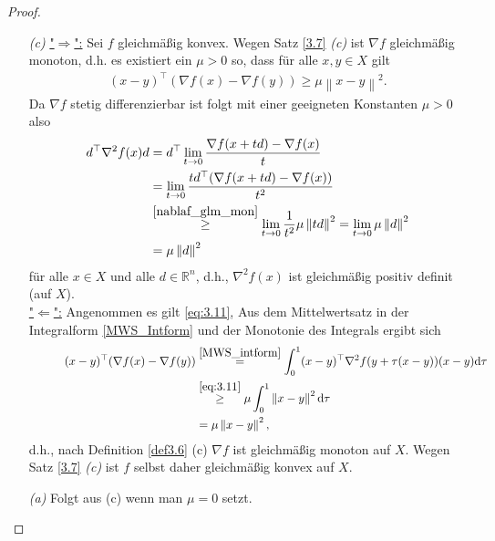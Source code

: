 \documentclass[a4paper,reqno]{amsart}
\theoremstyle{definition}
\theoremstyle{remark}
\newcommand\norm[1]{\left\lVert#1\right\rVert}
\newcommand{\dd}{\textnormal{d}}
\begin{document}
\begin{proof}$ $\newline
    \begin{itemize}%
\item[\emph{(c)}] \underline{"$\Rightarrow$\!":} Sei $f$ gleichmäßig konvex. Wegen
    Satz \ref{3.7} \emph{(c)} ist
    $\nabla f$ gleichmäßig monoton, d.h. es existiert ein $\mu>0$ so,
    dass für alle $x,y\in X$ gilt
    \begin{align}\label{nablaf_glm_mon}
        (x-y)^\top(\nabla f(x)-\nabla f(y))\geq\mu\norm{x-y}^2.
    \end{align}
    Da $\nabla f$ stetig differenzierbar ist folgt mit einer geeigneten
    Konstanten $\mu>0$ also
    \begin{align*}
        d^\top\nabla^2 f(x) d
        &= d^\top \lim_{t\to 0} \frac{\nabla f(x+td) - \nabla f(x)}{t}\\
        &= \lim_{t\to 0} \frac{td^\top(\nabla f(x+td) - \nabla f(x))}{t^2}\\
        &\stackrel{\eqref{nablaf_glm_mon}}{\geq} \lim_{t\to 0} \frac{1}{t^2} \mu\norm{td}^2
        = \lim_{t\to 0} \mu\norm{d}^2\\
        &= \mu\norm{d}^2\\
    \end{align*}
    für alle $x\in X$ und alle $d\in\mathbb{R}^n$, d.h., $\nabla^2 f(x)$
    ist gleichmäßig positiv definit (auf $X$).\\
    \underline{"$\Leftarrow$\!":}
    Angenommen es gilt \eqref{eq:3.11},  Aus dem Mittelwertsatz in der
    Integralform \ref{MWS_Intform} und der Monotonie des Integrals
    ergibt sich
    \begin{align}    
        \qquad\quad(x-y)^\top(\nabla f(x)-\nabla f(y))
        &\stackrel{\eqref{MWS_intform}}{=}
            \int_0^1 (x-y)^\top \nabla^2f(y+\tau(x-y))(x-y)\dd \tau\nonumber\\
        &\stackrel{\eqref{eq:3.11}}{\geq} \mu\int_0^1 \norm{x-y}^2\dd\tau\nonumber\\
        &= \mu\norm{x-y}^2,\label{eq3.12}
    \end{align}
    d.h., nach Definition \ref{def3.6} (c) $\nabla f$ ist gleichmäßig
    monoton auf $X$. Wegen Satz
    \ref{3.7} \emph{(c)} ist $f$ selbst daher gleichmäßig konvex auf $X$.
\item[\emph{(a)}] Folgt aus (c) wenn man $\mu=0$ setzt.
    

\end{itemize}
\end{proof}
\end{document}
